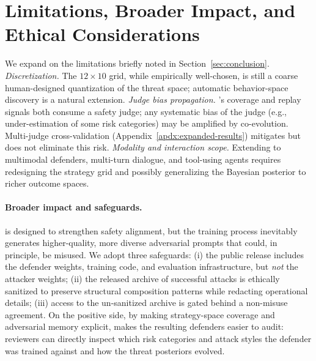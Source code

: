 \section{Limitations, Broader Impact, and Ethical Considerations}
\label{apdx:limitations}

We expand on the limitations briefly noted in Section~\ref{sec:conclusion}. \emph{Discretization.} The $12\times10$ grid, while empirically well-chosen, is still a coarse human-designed quantization of the threat space; automatic behavior-space discovery is a natural extension. \emph{Judge bias propagation.} \method's coverage and replay signals both consume a safety judge; any systematic bias of the judge (e.g., under-estimation of some risk categories) may be amplified by co-evolution. Multi-judge cross-validation (Appendix~\ref{apdx:expanded-results}) mitigates but does not eliminate this risk. \emph{Modality and interaction scope.} Extending \method to multimodal defenders, multi-turn dialogue, and tool-using agents requires redesigning the strategy grid and possibly generalizing the Bayesian posterior to richer outcome spaces.

\paragraph{Broader impact and safeguards.} \method is designed to strengthen safety alignment, but the training process inevitably generates higher-quality, more diverse adversarial prompts that could, in principle, be misused. We adopt three safeguards: (i) the public release includes the defender weights, training code, and evaluation infrastructure, but \emph{not} the attacker weights; (ii) the released archive of successful attacks is ethically sanitized to preserve structural composition patterns while redacting operational details; (iii) access to the un-sanitized archive is gated behind a non-misuse agreement. On the positive side, by making strategy-space coverage and adversarial memory explicit, \method makes the resulting defenders easier to audit: reviewers can directly inspect which risk categories and attack styles the defender was trained against and how the threat posteriors evolved.

